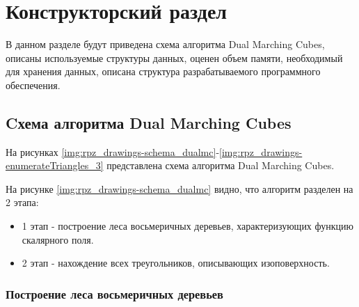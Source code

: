 \chapter{Конструкторский раздел}

В данном разделе будут приведена схема алгоритма Dual Marching Cubes, описаны используемые структуры данных, оценен объем памяти, необходимый для хранения данных, описана структура разрабатываемого программного обеспечения.

\section{Cхема алгоритма Dual Marching Cubes}

На рисунках \ref{img:rpz_drawings-schema_dualmc}-\ref{img:rpz_drawings-enumerateTriangles_3} представлена схема алгоритма Dual Marching Cubes.


На рисунке \ref{img:rpz_drawings-schema_dualmc} видно, что алгоритм разделен на 2 этапа:
\begin{itemize}
    \item 1 этап - построение леса восьмеричных деревьев, характеризующих функцию скалярного поля. 
    \item 2 этап - нахождение всех треугольников, описывающих изоповерхность.
\end{itemize}

\subsection{Построение леса восьмеричных деревьев}

